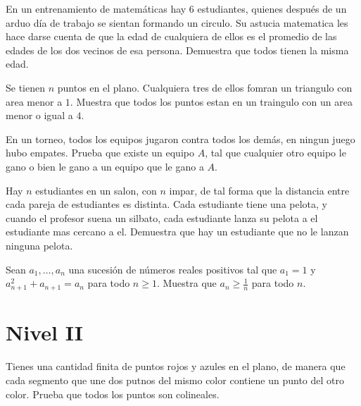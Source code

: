 \documentclass[11pt]{scrartcl}
\newcommand{\gad}{\textcolor{yellow}{$\bigstar$}}
\newcommand{\thmdifficulty}{0}
\newcommand{\problemdiff}[1]{\renewcommand{\thmdifficulty}{#1}}
\begin{document}
\problemdiff{2}
\begin{problem}
    En un entrenamiento de matemáticas hay 6 estudiantes, quienes después de un arduo día de trabajo se sientan formando un circulo. Su astucia matematica les hace darse cuenta 
    de que la edad de cualquiera de ellos es el promedio de las edades de los dos vecinos de esa persona. Demuestra que todos tienen la misma edad.
\end{problem}



\problemdiff{3}
\begin{problem} [\gad]
    Se tienen $n$ puntos en el plano. Cualquiera tres de ellos fomran un triangulo con area menor a $1$. Muestra que todos los puntos estan en un traingulo con un area menor o igual a $4$.
\end{problem}

\problemdiff{3}
\begin{problem}
    En un torneo, todos los equipos jugaron contra todos los demás, en ningun juego hubo empates. Prueba que existe un equipo $A$, tal que cualquier otro equipo le gano o bien le gano a un equipo que le gano a $A$.
\end{problem}


\problemdiff{3}
\begin{problem}
    Hay $n$ estudiantes en un salon, con $n$ impar, de tal forma que la distancia entre cada pareja de estudiantes es distinta. Cada estudiante tiene una pelota, y cuando el profesor suena un silbato, cada estudiante lanza su pelota a el estudiante mas cercano a el. Demuestra que hay un estudiante que no le lanzan ninguna pelota.
\end{problem}

\problemdiff{3}
\begin{problem}
    Sean $a_1,\ldots, a_n$ una sucesión de números reales positivos tal que $a_1=1$ y $a_{n+1}^2+a_{n+1}=a_n$ para todo $n \geq 1$. Muestra que $a_n\geq \frac 1n$ para todo $n$.
\end{problem}

\section{Nivel II}

\problemdiff{4}
\begin{problem}
    Tienes una cantidad finita de puntos rojos y azules en el plano, de manera que cada segmento que une dos putnos del mismo color contiene un punto del otro color. Prueba que todos los puntos son colineales.
\end{problem}
\end{document}
